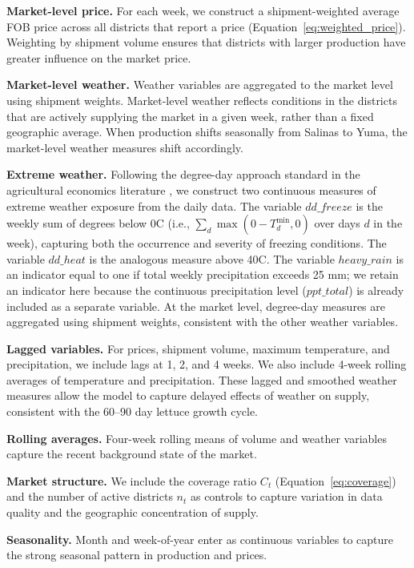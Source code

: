 \documentclass[12pt]{article}
\begin{document}
\textbf{Market-level price.} For each week, we construct a shipment-weighted average FOB price across all districts that report a price (Equation~\ref{eq:weighted_price}). Weighting by shipment volume ensures that districts with larger production have greater influence on the market price.

\textbf{Market-level weather.} Weather variables are aggregated to the market level using shipment weights. Market-level weather reflects conditions in the districts that are actively supplying the market in a given week, rather than a fixed geographic average. When production shifts seasonally from Salinas to Yuma, the market-level weather measures shift accordingly.

\textbf{Extreme weather.} Following the degree-day approach standard in the agricultural economics literature \citep{schlenker2009nonlinear}, we construct two continuous measures of extreme weather exposure from the daily data. The variable $dd\_freeze$ is the weekly sum of degrees below 0\textdegree C (i.e., $\sum_d \max(0 - T^{\min}_d, 0)$ over days $d$ in the week), capturing both the occurrence and severity of freezing conditions. The variable $dd\_heat$ is the analogous measure above 40\textdegree C. The variable $heavy\_rain$ is an indicator equal to one if total weekly precipitation exceeds 25 mm; we retain an indicator here because the continuous precipitation level ($ppt\_total$) is already included as a separate variable. At the market level, degree-day measures are aggregated using shipment weights, consistent with the other weather variables.

\textbf{Lagged variables.} For prices, shipment volume, maximum temperature, and precipitation, we include lags at 1, 2, and 4 weeks. We also include 4-week rolling averages of temperature and precipitation. These lagged and smoothed weather measures allow the model to capture delayed effects of weather on supply, consistent with the 60--90 day lettuce growth cycle.

\textbf{Rolling averages.} Four-week rolling means of volume and weather variables capture the recent background state of the market.

\textbf{Market structure.} We include the coverage ratio $C_t$ (Equation~\ref{eq:coverage}) and the number of active districts $n_t$ as controls to capture variation in data quality and the geographic concentration of supply.

\textbf{Seasonality.} Month and week-of-year enter as continuous variables to capture the strong seasonal pattern in production and prices.
\end{document}
